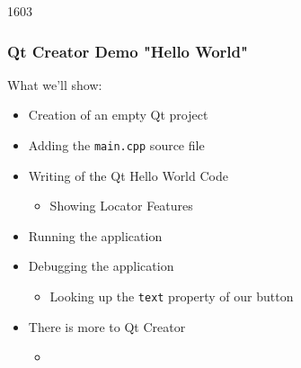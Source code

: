 \begin{slide}{1603}
  \frametitle{Qt Creator Demo "Hello World"}
  What we'll show:
  \begin{itemize}
  \item Creation of an empty Qt project
  \item Adding the \texttt{main.cpp} source file
  \item Writing of the Qt Hello World Code
    \begin{itemize}
    \item Showing Locator Features
    \end{itemize}
  \item Running the application
  \item Debugging the application
    \begin{itemize}
    \item Looking up the \texttt{text} property of our button
    \end{itemize}
  \end{itemize}
  \smallskip
  \begin{itemize}
  \item There is more to Qt Creator
    \begin{itemize}
    \item[] 
    \end{itemize}
  \end{itemize}
\end{slide}
